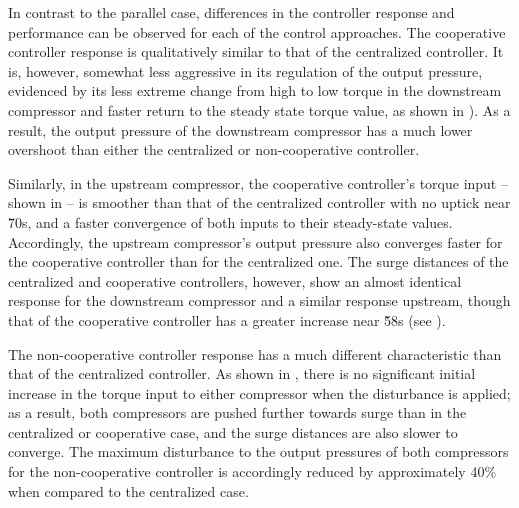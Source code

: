 In contrast to the parallel case, differences in the controller response and performance can be observed for each of the control approaches.
The cooperative controller response is qualitatively similar to that of the centralized controller.
It is, however, somewhat less aggressive in its regulation of the output pressure, evidenced by its less extreme change from high to low torque in the downstream compressor and faster return to the steady state torque value, as shown in ). 
As a result, the output pressure of the downstream compressor has a much lower overshoot than either the centralized or non-cooperative controller.

Similarly, in the upstream compressor, the cooperative controller's torque input -- shown in  -- is smoother than that of the centralized controller with no uptick near \u{70}{s}, and a faster convergence of both inputs to their steady-state values.
Accordingly, the upstream compressor's output pressure also converges faster for the cooperative controller than for the centralized one.
The surge distances of the centralized and cooperative controllers, however, show an almost identical response for the downstream compressor and a similar response upstream, though that of the cooperative controller has a greater increase near \u{58}{s} (see ).

The non-cooperative controller response has a much different characteristic than that of the centralized controller.
As shown in , there is no significant initial increase in the torque input to either compressor when the disturbance is applied; as a result, both compressors are pushed further towards surge than in the centralized or cooperative case, and the surge distances are also slower to converge.
The maximum disturbance to the output pressures of both compressors for the non-cooperative controller is accordingly reduced by approximately 40\% when compared to the centralized case.

